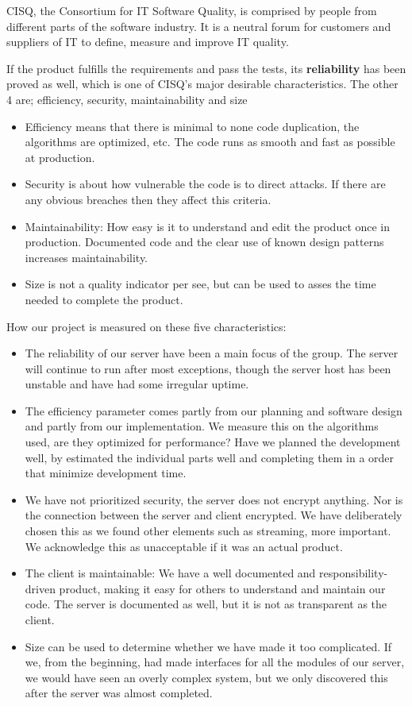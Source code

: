 CISQ, the Consortium for IT Software Quality, is comprised by people from different parts of the software industry. It is a neutral forum for customers and suppliers of IT to define, measure and improve IT quality.

If the product fulfills the requirements and pass the tests, its \textbf{reliability} has been proved as well, which is one of CISQ's  major desirable characteristics. The other 4 are; efficiency, security, maintainability and size \cite{CISQ}

\begin{itemize}
	\item Efficiency means that there is minimal to none code duplication, the algorithms are optimized, etc. The code runs as smooth and fast as possible at production.
	\item Security is about how vulnerable the code is to direct attacks. If there are any obvious breaches then they affect this criteria.
	\item Maintainability: How easy is it to understand and edit the product once in production. Documented code and the clear use of known design patterns increases maintainability. 
	\item Size is not a quality indicator per see, but can be used to asses the time needed to complete the product.
\end{itemize}

How our project is measured on these five characteristics:
\begin{itemize}
 	\item The reliability of our server have been a main focus of the group. The server will continue to run after most exceptions, though the server host has been unstable and have had some irregular uptime.
 	\item The efficiency parameter comes partly from our planning and software design and partly from our implementation. We measure this on the algorithms used, are they optimized for performance? Have we planned the development well, by estimated the individual parts well and completing them in a order that minimize development time.
 	\item We have not prioritized security, the server does not encrypt anything. Nor is the connection between the server and client encrypted. We have deliberately chosen this as we found other elements such as streaming, more important. We acknowledge this as unacceptable if it was an actual product.  
 	\item The client is maintainable: We have a well documented and responsibility-driven product, making it easy for others to understand and maintain our code. The server is documented as well, but it is not as transparent as the client.
	\item Size can be used to determine whether we have made it too complicated. If we, from the beginning, had made interfaces for all the modules of our server, we would have seen an overly complex system, but we only discovered this after the server was almost completed. 
\end{itemize}

